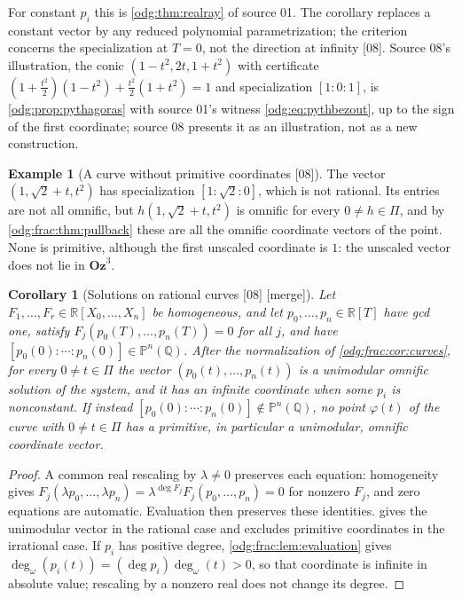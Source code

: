 \documentclass[11pt,oneside]{article}
\numberwithin{equation}{section}
\newtheorem{corollary}[corollary]{Corollary}
\theoremstyle{definition}
\newtheorem{example}[example]{Example}
\theoremstyle{remark}
\newcommand{\Oz}{\mathbf{Oz}}
\newcommand{\Q}{\mathbb Q}
\newcommand{\R}{\mathbb R}
\newcommand{\ddeg}{\operatorname{deg}_{\omega}}
\newcommand{\src}[1]{\textup{\textsf{\small[#1]}}}
\newcommand{\mergetag}{\textup{\textsf{\small[merge]}}}
\begin{document}
For constant $p_i$ this is \cref{odg:thm:realray} of source 01. The corollary
replaces a constant vector by any reduced polynomial parametrization; the
criterion concerns the specialization at $T=0$, not the direction at
infinity \src{08}. Source 08's illustration, the conic
$(1-t^2,2t,1+t^2)$ with certificate
$(1+\tfrac{t^2}2)(1-t^2)+\tfrac{t^2}2(1+t^2)=1$ and specialization $[1:0:1]$, is
\cref{odg:prop:pythagoras} with source 01's witness \eqref{odg:eq:pythbezout},
up to the sign of the first coordinate; source 08 presents it as an
illustration, not as a new construction.

\begin{example}[A curve without primitive coordinates \src{08}]\label{odg:frac:ex:noprimitive}
The vector $(1,\sqrt2+t,t^2)$ has specialization $[1:\sqrt2:0]$, which is not
rational. Its entries are not all omnific, but $h(1,\sqrt2+t,t^2)$ is omnific
for every $0\ne h\in\Pi$, and by \cref{odg:frac:thm:pullback} these are all the
omnific coordinate vectors of the point. None is primitive, although the first
unscaled coordinate is $1$: the unscaled vector does not lie in $\Oz^3$.
\end{example}

\begin{corollary}[Solutions on rational curves \src{08} \mergetag]\label{odg:frac:cor:homogeneous}
Let $F_1,\ldots,F_r\in\R[X_0,\ldots,X_n]$ be homogeneous, and let
$p_0,\ldots,p_n\in\R[T]$ have gcd one, satisfy
$F_j(p_0(T),\ldots,p_n(T))=0$ for all $j$, and have
$[p_0(0):\cdots:p_n(0)]\in\mathbb P^n(\Q)$. After the normalization of
\cref{odg:frac:cor:curves}, for every $0\ne t\in\Pi$ the vector
$(p_0(t),\ldots,p_n(t))$ is a unimodular omnific solution of the system, and it
has an infinite coordinate when some $p_i$ is nonconstant. If instead
$[p_0(0):\cdots:p_n(0)]\notin\mathbb P^n(\Q)$, no point $\varphi(t)$ of the curve
with $0\ne t\in\Pi$ has a primitive, in particular a unimodular, omnific
coordinate vector.
\end{corollary}
\begin{proof}
A common real rescaling by $\lambda\ne0$ preserves each equation:
homogeneity gives $F_j(\lambda p_0,\ldots,\lambda p_n)
=\lambda^{\deg F_j}F_j(p_0,\ldots,p_n)=0$ for nonzero $F_j$, and zero
equations are automatic. Evaluation then preserves these identities.
 gives the unimodular vector in the rational case
and excludes primitive coordinates in the irrational case. If $p_i$ has
positive degree, \cref{odg:frac:lem:evaluation} gives
$\ddeg(p_i(t))=(\deg p_i)\ddeg(t)>0$, so that coordinate is infinite in
absolute value; rescaling by a nonzero real does not change its degree.
\end{proof}
\end{document}
